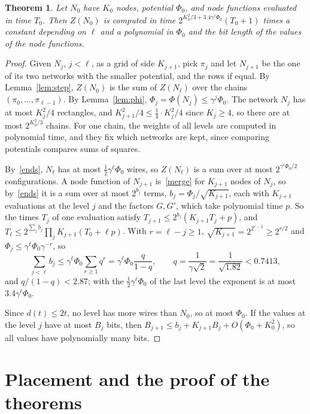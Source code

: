 \documentclass[10pt]{article}
\newtheorem{theorem}{Theorem}
\begin{document}
\begin{theorem}\label{thm:net}
Let $N_0$ have $K_0$ nodes, potential $\Phi_0$, and node functions evaluated in time $T_0$. Then $Z(N_0)$ is computed in time $2^{K_0^2/3+3.4\gamma^\ell\Phi_0}(T_0+1)$ times a constant depending on $\ell$ and a polynomial in $\Phi_0$ and the bit length of the values of the node functions.
\end{theorem}
\begin{proof}
Given $N_j$, $j<\ell$, as a grid of side $K_{j+1}$, pick $\pi_j$ and let $N_{j+1}$ be the one of its two networks with the smaller potential, and the rows if equal. By Lemma~\ref{lem:step}, $Z(N_0)$ is the sum of $Z(N_\ell)$ over the chains $(\pi_0,\dots,\pi_{\ell-1})$. By Lemma~\ref{lem:phi}, $\Phi_j=\Phi(N_j)\le\gamma^j\Phi_0$. The network $N_j$ has at most $K_j^2/4$ rectangles, and $K_{j+1}^2/4\le\frac14\cdot K_j^2/4$ since $K_j\ge4$, so there are at most $2^{K_0^2/3}$ chains. For one chain, the weights of all levels are computed in polynomial time, and they fix which networks are kept, since comparing potentials compares sums of squares.

By~\eqref{ends}, $N_\ell$ has at most $\frac12\gamma^\ell\Phi_0$ wires, so $Z(N_\ell)$ is a sum over at most $2^{\gamma^\ell\Phi_0/2}$ configurations. A node function of $N_{j+1}$ is~\eqref{merge} for $K_{j+1}$ nodes of $N_j$, so by~\eqref{ends} it is a sum over at most $2^{b_j}$ terms, $b_j=\Phi_j/\sqrt{K_{j+1}}$, each with $K_{j+1}$ evaluations at the level $j$ and the factors $G,G'$, which take polynomial time $p$. So the times $T_j$ of one evaluation satisfy $T_{j+1}\le2^{b_j}(K_{j+1}T_j+p)$, and $T_\ell\le2^{\sum_jb_j}\prod_jK_{j+1}(T_0+\ell p)$. With $r=\ell-j\ge1$, $\sqrt{K_{j+1}}=2^{2^{r-2}}\ge2^{r/2}$ and $\Phi_j\le\gamma^\ell\Phi_0\gamma^{-r}$, so
\[
\sum_{j<\ell}b_j\le\gamma^\ell\Phi_0\sum_{r\ge1}q^r=\gamma^\ell\Phi_0\frac q{1-q},\qquad q=\frac1{\gamma\sqrt2}=\frac1{\sqrt{1.82}}<0.7413,
\]
and $q/(1-q)<2.87$; with the $\frac12\gamma^\ell\Phi_0$ of the last level the exponent is at most $3.4\gamma^\ell\Phi_0$.

Since $d(t)\le2t$, no level has more wires than $N_0$, so at most $\Phi_0$. If the values at the level $j$ have at most $B_j$ bits, then $B_{j+1}\le b_j+K_{j+1}B_j+O(\Phi_0+K_0^2)$, so all values have polynomially many bits.
\end{proof}

\section{Placement and the proof of the theorems}
\end{document}
